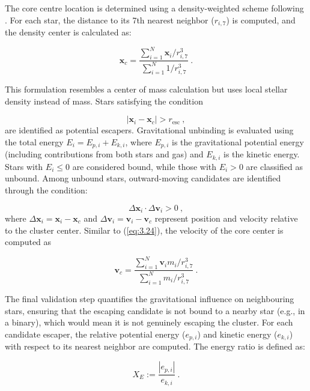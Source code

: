 The core centre location is determined using a density-weighted scheme following \citet{1993MNRAS.261..497S}. For each star, the distance to its 7th nearest neighbor ($r_{i,7}$) is computed, and the density center is calculated as:

\begin{equation}
	\mathbf{x}_c = \frac{\sum_{i = 1}^{N} \mathbf{x}_i / r_{i,7}^3}{\sum_{i = 1}^{N} 1 / r_{i,7}^3} ~. \label{eq:3.24}
\end{equation}

This formulation resembles a center of mass calculation but uses local stellar density instead of mass. Stars satisfying the condition

\begin{equation}
	|\mathbf{x}_i - \mathbf{x}_c| > r_{\text{esc}}~,
\end{equation}
are identified as potential escapers. Gravitational unbinding is evaluated using the total energy $E_i = E_{p,i} + E_{k,i}$, where $E_{p,i}$ is the gravitational potential energy (including contributions from both stars and gas) and $E_{k,i}$ is the kinetic energy. Stars with $E_i \leq 0$ are considered bound, while those with $E_i > 0$ are classified as unbound. Among unbound stars, outward-moving candidates are identified through the condition:

\begin{equation}
	\Delta\mathbf{x}_i \cdot \Delta\mathbf{v}_i > 0~,
\end{equation}
where $\Delta\mathbf{x}_i = \mathbf{x}_i - \mathbf{x}_c$ and $\Delta\mathbf{v}_i = \mathbf{v}_i - \mathbf{v}_c$ represent position and velocity relative to the cluster center. Similar to (\ref{eq:3.24}), the velocity of the core center is computed as

\begin{equation}
	\mathbf{v}_c = \frac{\sum_{i = 1}^{N} \mathbf{v}_i m_i / r_{i,7}^3}{\sum_{i = 1}^{N} m_i / r_{i,7}^3}~.
\end{equation}

The final validation step quantifies the gravitational influence on neighbouring stars, ensuring that the escaping candidate is not bound to a nearby star (e.g., in a binary), which would mean it is not genuinely escaping the cluster. For each candidate escaper, the relative potential energy ($e_{p,i}$) and kinetic energy ($e_{k,i}$) with respect to its nearest neighbor are computed. The energy ratio is defined as:

\begin{equation}
	X_E := \frac{|e_{p,i}|}{e_{k,i}}~.
\end{equation}

